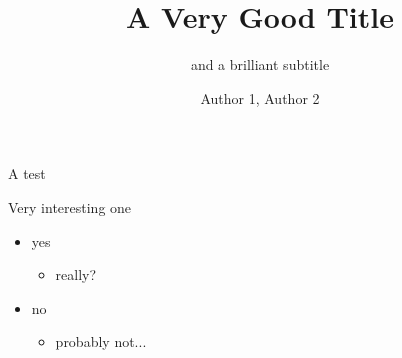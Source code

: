 \documentclass{beamer}
\title{A Very Good Title}
\subtitle{and a brilliant subtitle}
\author{Author 1, Author 2}
\institute{Institute}
\begin{document}
\maketitle

\begin{frame}{A test}
\begin{block}{Very interesting one}
\begin{itemize}
\item yes
  \begin{itemize}
  \item really?
    \end{itemize}
  \item no
    \begin{itemize}
    \item probably not...
      \end{itemize}
\end{itemize}
\end{block}
\end{frame}
\end{document}
